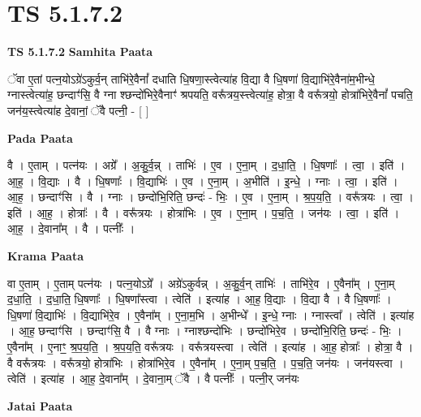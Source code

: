 \documentclass[17pt]{extarticle}
\begin{document}
\section{ TS 5.1.7.2 }

\textbf{TS 5.1.7.2 } \newline
\textbf{Samhita Paata} \newline

ॅवा ए॒तां पत्न॒योऽग्रे॑ऽकुर्व॒न् ताभि॑रे॒वैनां᳚ दधाति धि॒षणा॒स्त्वेत्या॑ह वि॒द्या वै धि॒षणा॑ वि॒द्याभि॑रे॒वैना॑म॒भीन्धे॒ ग्नास्त्वेत्या॑ह॒ छन्दाꣳ॑सि॒ वै ग्ना श्छन्दो॑भिरे॒वैनाꣳ॑ श्रपयति॒ वरू᳚त्रय॒स्त्त्वेत्या॑ह॒ होत्रा॒ वै वरू᳚त्रयो॒ होत्रा॑भिरे॒वैनां᳚ पचति॒ जन॑य॒स्त्वेत्या॑ह दे॒वानां॒ ॅवै पत्नी॒ - [  ] \newline

\textbf{Pada Paata} \newline

वै । ए॒ताम् । पत्न॑यः । अग्रे᳚ । अ॒कु॒र्व॒न्न् । ताभिः॑ । ए॒व । ए॒ना॒म् । द॒धा॒ति॒ । धि॒षणाः᳚ । त्वा॒ । इति॑ । आ॒ह॒ । वि॒द्याः । वै । धि॒षणाः᳚ । वि॒द्याभिः॑ । ए॒व । ए॒ना॒म् । अ॒भीति॑ । इ॒न्धे॒ । ग्नाः । त्वा॒ । इति॑ । आ॒ह॒ । छन्दाꣳ॑सि । वै । ग्नाः । छन्दो॑भि॒रिति॒ छन्दः॑ - भिः॒ । ए॒व । ए॒ना॒म् । श्र॒प॒य॒ति॒ । वरू᳚त्रयः । त्वा॒ । इति॑ । आ॒ह॒ । होत्राः᳚ । वै । वरू᳚त्रयः । होत्रा॑भिः । ए॒व । ए॒ना॒म् । प॒च॒ति॒ । जन॑यः । त्वा॒ । इति॑ । आ॒ह॒ । दे॒वाना᳚म् । वै । पत्नीः᳚ ।  \newline


\textbf{Krama Paata} \newline

वा ए॒ताम् । ए॒ताम् पत्न॑यः । पत्न॒योऽग्रे᳚ । अग्रे॑ऽकुर्वन्न् । अ॒कु॒र्व॒न् ताभिः॑ । ताभि॑रे॒व । ए॒वैना᳚म् । ए॒ना॒म् द॒धा॒ति॒ । द॒धा॒ति॒ धि॒षणाः᳚ । धि॒षणा᳚स्त्वा । त्वेति॑ । इत्या॑ह । आ॒ह॒ वि॒द्याः । वि॒द्या वै । वै धि॒षणाः᳚ । धि॒षणा॑ वि॒द्याभिः॑ । वि॒द्याभि॑रे॒व । ए॒वैना᳚म् । ए॒ना॒म॒भि । अ॒भीन्धे᳚ । इ॒न्धे॒ ग्नाः । ग्नास्त्वा᳚ । त्वेति॑ । इत्या॑ह । आ॒ह॒ छन्दाꣳ॑सि । छन्दाꣳ॑सि॒ वै । वै ग्नाः । ग्नाश्छन्दो॑भिः । छन्दो॑भिरे॒व । छन्दो॑भि॒रिति॒ छन्दः॑ - भिः॒ । ए॒वैना᳚म् । ए॒नाꣳ॒॒ श्र॒प॒य॒ति॒ । श्र॒प॒य॒ति॒ वरू᳚त्रयः । वरू᳚त्रयस्त्वा । त्वेति॑ । इत्या॑ह । आ॒ह॒ होत्राः᳚ । होत्रा॒ वै । वै वरू᳚त्रयः । वरू᳚त्रयो॒ होत्रा॑भिः । होत्रा॑भिरे॒व । ए॒वैना᳚म् । ए॒ना॒म् प॒च॒ति॒ । प॒च॒ति॒ जन॑यः । जन॑यस्त्वा । त्वेति॑ । इत्या॑ह । आ॒ह॒ दे॒वाना᳚म् । दे॒वाना॒म् ॅवै । वै पत्नीः᳚ । पत्नी॒र् जन॑यः \newline

\textbf{Jatai Paata} \newline
\end{document}
